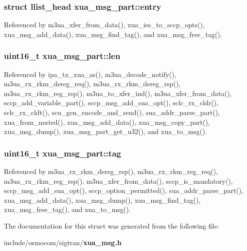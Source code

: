 \subsubsection[{entry}]{\setlength{\rightskip}{0pt plus 5cm}struct llist\+\_\+head xua\+\_\+msg\+\_\+part\+::entry}\label{structxua__msg__part_a2617f2f6459d7d55ac08adafdda62f9b}


Referenced by m3ua\+\_\+xfer\+\_\+from\+\_\+data(), xua\+\_\+ies\+\_\+to\+\_\+sccp\+\_\+opts(), xua\+\_\+msg\+\_\+add\+\_\+data(), xua\+\_\+msg\+\_\+find\+\_\+tag(), and xua\+\_\+msg\+\_\+free\+\_\+tag().

\subsubsection[{len}]{\setlength{\rightskip}{0pt plus 5cm}uint16\+\_\+t xua\+\_\+msg\+\_\+part\+::len}\label{structxua__msg__part_afefe51df87e09491ce07ea56bc5248fb}


Referenced by ipa\+\_\+tx\+\_\+xua\+\_\+as(), m3ua\+\_\+decode\+\_\+notify(), m3ua\+\_\+rx\+\_\+rkm\+\_\+dereg\+\_\+req(), m3ua\+\_\+rx\+\_\+rkm\+\_\+dereg\+\_\+rsp(), m3ua\+\_\+rx\+\_\+rkm\+\_\+reg\+\_\+rsp(), m3ua\+\_\+to\+\_\+xfer\+\_\+ind(), m3ua\+\_\+xfer\+\_\+from\+\_\+data(), sccp\+\_\+add\+\_\+variable\+\_\+part(), sccp\+\_\+msg\+\_\+add\+\_\+sua\+\_\+opt(), sclc\+\_\+rx\+\_\+cldr(), sclc\+\_\+rx\+\_\+cldt(), scu\+\_\+gen\+\_\+encode\+\_\+and\+\_\+send(), sua\+\_\+addr\+\_\+parse\+\_\+part(), xua\+\_\+from\+\_\+nested(), xua\+\_\+msg\+\_\+add\+\_\+data(), xua\+\_\+msg\+\_\+copy\+\_\+part(), xua\+\_\+msg\+\_\+dump(), xua\+\_\+msg\+\_\+part\+\_\+get\+\_\+u32(), and xua\+\_\+to\+\_\+msg().

\subsubsection[{tag}]{\setlength{\rightskip}{0pt plus 5cm}uint16\+\_\+t xua\+\_\+msg\+\_\+part\+::tag}\label{structxua__msg__part_a7b609ec03d7adc1e897511c81f69d427}


Referenced by m3ua\+\_\+rx\+\_\+rkm\+\_\+dereg\+\_\+rsp(), m3ua\+\_\+rx\+\_\+rkm\+\_\+reg\+\_\+req(), m3ua\+\_\+rx\+\_\+rkm\+\_\+reg\+\_\+rsp(), m3ua\+\_\+xfer\+\_\+from\+\_\+data(), sccp\+\_\+is\+\_\+mandatory(), sccp\+\_\+msg\+\_\+add\+\_\+sua\+\_\+opt(), sccp\+\_\+option\+\_\+permitted(), sua\+\_\+addr\+\_\+parse\+\_\+part(), xua\+\_\+msg\+\_\+add\+\_\+data(), xua\+\_\+msg\+\_\+dump(), xua\+\_\+msg\+\_\+find\+\_\+tag(), xua\+\_\+msg\+\_\+free\+\_\+tag(), and xua\+\_\+to\+\_\+msg().



The documentation for this struct was generated from the following file\+:\begin{DoxyCompactItemize}
\item 
include/osmocom/sigtran/{\bf xua\+\_\+msg.\+h}\end{DoxyCompactItemize}
